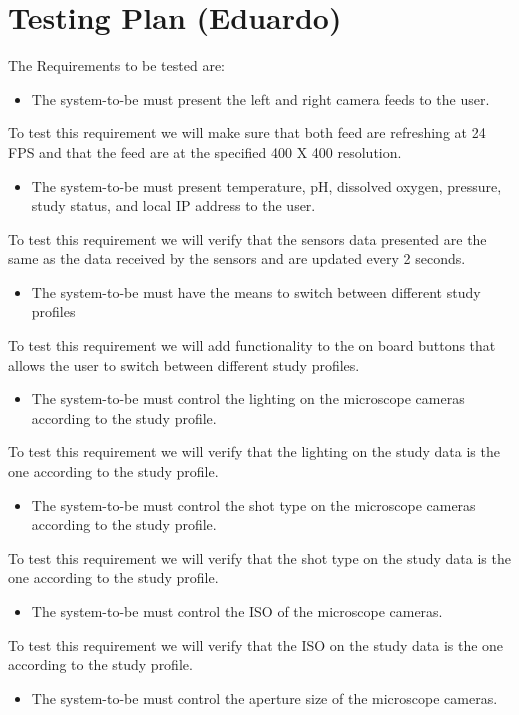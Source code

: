 \section{Testing Plan (Eduardo)}
The Requirements to be tested are:
\begin{itemize}
    \item The system-to-be must present the left and right camera feeds to the user.
\end{itemize}
To test this requirement we will make sure that both feed are refreshing at 24 FPS and that the feed are at the specified 400 X 400 resolution.
\begin{itemize}
    \item The system-to-be must present temperature, pH, dissolved oxygen, pressure, study status, and local IP address to the user.
\end{itemize}
To test this requirement we will verify that the sensors data presented are the same as the data received by the sensors and are updated every 2 seconds.
\begin{itemize}
    \item The system-to-be must have the means to switch between different study profiles
\end{itemize}
To test this requirement we will add functionality to the on board buttons that allows the user to switch between different study profiles.
\begin{itemize}
    \item The system-to-be must control the lighting on the microscope cameras according to the study profile.
\end{itemize}
To test this requirement we will verify that the lighting on the study data is the one according to the study profile.
\begin{itemize}
    \item The system-to-be must control the shot type on the microscope cameras according to the study profile.
\end{itemize}
To test this requirement we will verify that the shot type on the study data is the one according to the study profile.
\begin{itemize}
    \item The system-to-be must control the ISO of the microscope cameras.
\end{itemize}
To test this requirement we will verify that the ISO on the study data is the one according to the study profile.
\begin{itemize}
    \item The system-to-be must control the aperture size of the microscope cameras.
\end{itemize}
